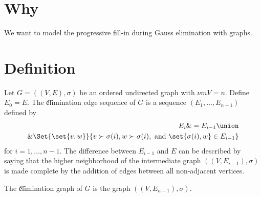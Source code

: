 

\section*{Why}

We want to model the progressive fill-in during Gauss elimination with graphs.

\section*{Definition}

Let $G = ((V, E), \sigma )$ be an ordered undirected graph with $\nu m{V} = n$.
Define $E_0 = E$.
The \t{elimination edge sequence} of $G$ is a sequence $(E_1, \dots , E_{n-1})$ defined by
    \[
\begin{aligned}
E_i \& = E_{i-1} \union \\ \&\Set{\set{v, w}}{v \succ \sigma (i), w \succ \sigma (i), \text{ and } \set{\sigma (i), w} \in E_{i-1}}
\end{aligned}
    \]
for $i = 1, \dots , n-1$.
The difference between $E_{i-1}$ and $E$ can be described by saying that the higher neighborhood of the intermediate graph $((V, E_{i-1}), \sigma )$ is made complete by the addition of edges between all non-adjacent vertices.

The \t{elimination graph} of $G$ is the graph $((V, E_{n-1}), \sigma )$.

\blankpage